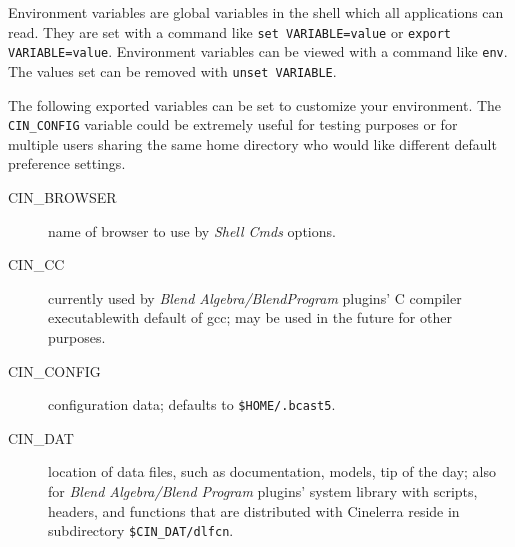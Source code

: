 Environment variables are global variables in the shell which all applications can read. They are set with a command like \texttt{set VARIABLE=value} or \texttt{export VARIABLE=value}. Environment variables can be viewed with a command like \texttt{env}.   The values set can be removed with \texttt{unset VARIABLE}.

The following exported variables can be set to customize your environment. The \texttt{CIN\_CONFIG} variable could be extremely useful for testing purposes or for multiple users sharing the same home directory who would like different default preference settings.

\begin{description}
    \item[{\small CIN\_BROWSER}] name of browser to use by \textit{Shell Cmds} options.
    \item[{\small CIN\_CC}] currently used by \textit{Blend Algebra/BlendProgram} plugins' C compiler executablewith default of gcc; may be used in the future for other purposes.
    \item[{\small CIN\_CONFIG}] configuration data; defaults to \texttt{\$HOME/.bcast5}.
    \item[{\small CIN\_DAT}] location of data files, such as documentation, models, tip of the day; also for \textit{Blend Algebra/Blend Program} plugins' system library with scripts, headers, and
functions that are distributed with Cinelerra reside in subdirectory \texttt{\$CIN\_DAT/dlfcn}.


\end{description}
